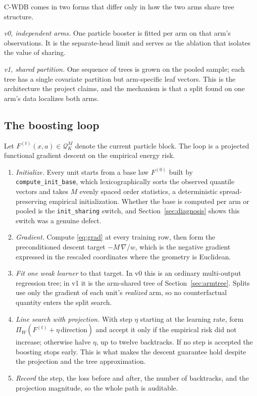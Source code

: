\documentclass[11pt,a4paper]{article}
\theoremstyle{definition}
\theoremstyle{remark}
\newcommand{\Qcal}{\mathcal{Q}}
\newcommand{\CWDB}{\textsf{C-WDB}}
\begin{document}
\CWDB{} comes in two forms that differ only in how the two arms share tree
structure.

\emph{v0, independent arms.} One particle booster is fitted per arm on that
arm's observations. It is the separate-head limit and serves as the ablation
that isolates the value of sharing.

\emph{v1, shared partition.} One sequence of trees is grown on the pooled sample;
each tree has a single covariate partition but arm-specific leaf vectors. This is
the architecture the project claims, and the mechanism is that a split found on
one arm's data localizes both arms.

\subsection{The boosting loop}
\label{sec:boosting}

Let $F^{(t)}(x, a) \in \Qcal_K^M$ denote the current particle block. The loop is
a projected functional gradient descent on the empirical energy risk.

\begin{enumerate}
\item \emph{Initialize.} Every unit starts from a base law
$F^{(0)}$ built by \texttt{compute\_init\_base}, which lexicographically sorts
the observed quantile vectors and takes $M$ evenly spaced order statistics, a
deterministic spread-preserving empirical initialization. Whether the base is
computed per arm or pooled is the \texttt{init\_sharing} switch, and
Section~\ref{sec:diagnosis} shows this switch was a genuine defect.
\item \emph{Gradient.} Compute \eqref{eq:grad} at every training row, then form
the preconditioned descent target $-M\, \nabla / w$, which is the negative
gradient expressed in the rescaled coordinates where the geometry is Euclidean.
\item \emph{Fit one weak learner} to that target. In v0 this is an ordinary
multi-output regression tree; in v1 it is the arm-shared tree of
Section~\ref{sec:armtree}. Splits use only the gradient of each unit's
\emph{realized} arm, so no counterfactual quantity enters the split search.
\item \emph{Line search with projection.} With step $\eta$ starting at the
learning rate, form $\Pi_W(F^{(t)} + \eta\,\text{direction})$ and accept it only
if the empirical risk did not increase; otherwise halve $\eta$, up to twelve
backtracks. If no step is accepted the boosting stops early. This is what makes
the descent guarantee hold despite the projection and the tree approximation.
\item \emph{Record} the step, the loss before and after, the number of
backtracks, and the projection magnitude, so the whole path is auditable.
\end{enumerate}
\end{document}
